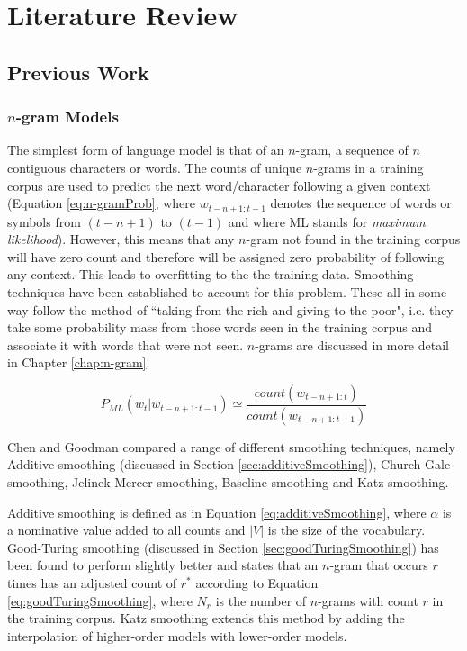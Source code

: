 \chapter{Literature Review}\label{chap:literatureReview}


\section{Previous Work}

\subsection{$n$-gram Models}

The simplest form of language model is that of an $n$-gram, a sequence of $n$ contiguous characters or words. The counts of unique $n$-grams in a training corpus are used to predict the next word/character following a given context (Equation \ref{eq:n-gramProb}, where $w_{t-n+1:t-1}$ denotes the sequence of words or symbols from $(t-n+1)$ to $(t-1)$ and where ML stands for \textit{maximum likelihood}). However, this means that any $n$-gram not found in the training corpus will have zero count and therefore will be assigned zero probability of following any context. This leads to overfitting to the the training data. Smoothing techniques have been established to account for this problem. These all in some way follow the method of ``taking from the rich and giving to the poor", i.e. they take some probability mass from those words seen in the training corpus and associate it with words that were not seen. $n$-grams are discussed in more detail in Chapter \ref{chap:n-gram}. 

\begin{equation}
P_{ML}(w_{t}|w_{t-n+1:t-1})\simeq\frac{count(w_{t-n+1:t})}{count(w_{t-n+1:t-1})}
\label{eq:n-gramProb}
\end{equation}


Chen and Goodman \cite{chen1996empirical} \cite{chen1999empirical} compared a range of different smoothing techniques, namely Additive smoothing (discussed in Section \ref{sec:additiveSmoothing}), Church-Gale smoothing, Jelinek-Mercer smoothing, Baseline smoothing and Katz smoothing.  

Additive smoothing is defined as in Equation \ref{eq:additiveSmoothing}, where $\alpha$ is a nominative value added to all counts and $|V|$ is the size of the vocabulary. Good-Turing smoothing (discussed in Section \ref{sec:goodTuringSmoothing}) has been found to perform slightly better and states that an $n$-gram that occurs $r$ times has an adjusted count of $r^{*}$ according to Equation \ref{eq:goodTuringSmoothing}, where $N_{r}$ is the number of $n$-grams with count $r$ in the training corpus. Katz smoothing extends this method by adding the interpolation of higher-order models with lower-order models. 

